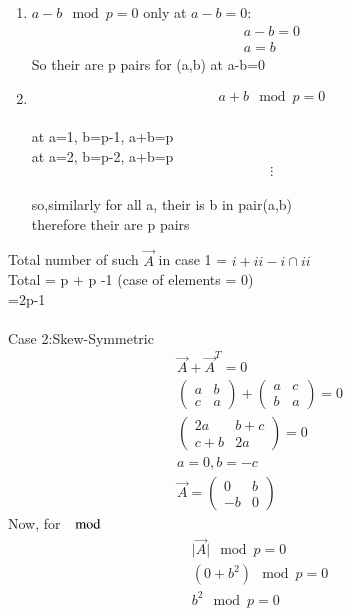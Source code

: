 \documentclass[journal]{IEEEtran}
\begin{document}
\begin{enumerate}[label=\roman*)]
    \item $a-b\mod p =0$ only at $a-b=0$:
        \begin{align}
            a-b=0\\
            a=b
        \end{align}
        So their are p pairs for (a,b) at a-b=0\\
    \item   \begin{align}
                a+b\mod p =0\\
            \end{align}
            \begin{center}    
                at a=1, b=p-1, a+b=p\\
                at a=2, b=p-2, a+b=p\\
                \[ \vdots \] \\
                so,similarly for all a, their is b in pair(a,b)\\
                therefore their are p pairs
            \end{center}
\end{enumerate}
Total number of such $\vec{A}$ in case 1 = ${i}+{ii}-{i\cap ii}$\\
Total = p + p -1 (case of elements = 0)\\
=2p-1\\\\
Case 2:Skew-Symmetric
\begin{align}
    \vec{A}+\vec{A}^T=0\\
    \begin{pmatrix}a&b\\c&a\end{pmatrix}+\begin{pmatrix}a&c\\b&a\end{pmatrix}=0\\
    \begin{pmatrix}2a&b+c\\c+b&2a\end{pmatrix}=0\\
    a=0,b=-c\\
    \vec{A}=\begin{pmatrix}0&b\\-b&0\end{pmatrix}
\end{align}
Now, for $\mod$
\begin{align}
    \vert \vec{A} \vert \mod p =0\\
    (0+b^2) \mod p=0\\
    b^2 \mod p=0
\end{align}
\end{document}

